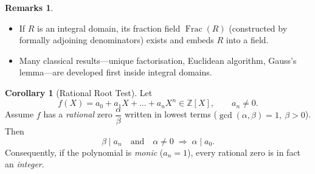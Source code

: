 \documentclass[12pt]{article}
\theoremstyle{definition} %
\newtheorem{remarks}{Remarks}
\newtheorem{corollary}{Corollary}
\theoremstyle{plain} %
\begin{document}
  \begin{remarks}
     \begin{itemize}
        \item If \(R\) is an integral domain, its fraction field
              \(\operatorname{Frac}(R)\) (constructed by formally adjoining
              denominators) exists and embeds \(R\) into a field.
        \item Many classical results—unique factorisation, Euclidean
              algorithm, Gauss’s lemma—are developed first inside integral
              domains.
     \end{itemize}
  \end{remarks}
  \begin{corollary}[Rational Root Test]\label{cor:rational_root_test}
    Let
    \[
       f(X)=a_{0}+a_{1}X+\dots+a_{n}X^{n}\in\mathbb{Z}[X],
       \qquad a_{n}\neq 0.
    \]
    Assume \(f\) has a \emph{rational} zero \(\dfrac{\alpha}{\beta}\) written
    in lowest terms (\(\gcd(\alpha,\beta)=1,\ \beta>0\)).  
    Then
    \[
       \beta\mid a_{n}
       \quad\text{and}\quad
       \alpha\neq 0\;\Longrightarrow\; \alpha\mid a_{0}.
    \]
    Consequently, if the polynomial is \emph{monic} (\(a_{n}=1\)),
    every rational zero is in fact an \emph{integer}.
    \end{corollary}
    
\end{document}
